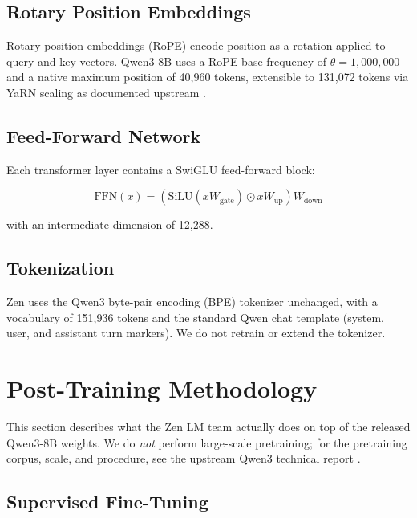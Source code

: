 \documentclass[11pt,a4paper]{article}
\begin{document}
\subsection{Rotary Position Embeddings}

Rotary position embeddings (RoPE) \cite{su2021rope} encode position as a rotation applied to query
and key vectors. Qwen3-8B uses a RoPE base frequency of $\theta = 1{,}000{,}000$ and a native
maximum position of 40{,}960 tokens, extensible to 131{,}072 tokens via YaRN scaling
\cite{peng2023yarn} as documented upstream \cite{qwen3report}.

\subsection{Feed-Forward Network}

Each transformer layer contains a SwiGLU \cite{shazeer2020glu} feed-forward block:

\begin{equation}
  \text{FFN}(x) = \left(\text{SiLU}(xW_{\text{gate}}) \odot xW_{\text{up}}\right) W_{\text{down}}
\end{equation}

with an intermediate dimension of 12{,}288.

\subsection{Tokenization}

Zen uses the Qwen3 byte-pair encoding (BPE) tokenizer unchanged, with a vocabulary of 151{,}936
tokens and the standard Qwen chat template (system, user, and assistant turn markers). We do not
retrain or extend the tokenizer.

\section{Post-Training Methodology}

This section describes what the Zen LM team actually does on top of the released Qwen3-8B weights.
We do \emph{not} perform large-scale pretraining; for the pretraining corpus, scale, and procedure,
see the upstream Qwen3 technical report \cite{qwen3report}.

\subsection{Supervised Fine-Tuning}
\end{document}
